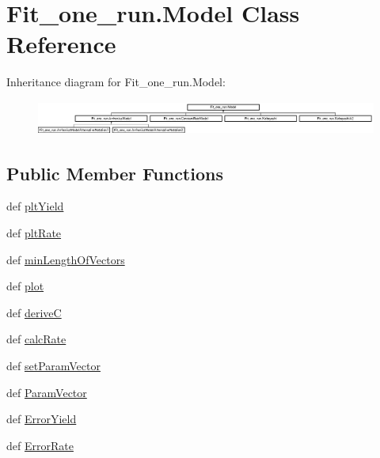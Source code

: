 \hypertarget{classFit__one__run_1_1Model}{\section{\-Fit\-\_\-one\-\_\-run.\-Model \-Class \-Reference}
\label{classFit__one__run_1_1Model}
}
\-Inheritance diagram for \-Fit\-\_\-one\-\_\-run.\-Model\-:\begin{figure}[H]
\begin{center}
\leavevmode
\includegraphics[height=1.131313cm]{classFit__one__run_1_1Model}
\end{center}
\end{figure}
\subsection*{\-Public \-Member \-Functions}
\begin{DoxyCompactItemize}
\item 
def \hyperlink{classFit__one__run_1_1Model_aa304b32155938a713c33f0dc03a135f3}{plt\-Yield}
\item 
def \hyperlink{classFit__one__run_1_1Model_a9c28d95902adf00f5aaa642f0919fc61}{plt\-Rate}
\item 
def \hyperlink{classFit__one__run_1_1Model_a26fc879ca33c9171ebb4a97bc4b0c46b}{min\-Length\-Of\-Vectors}
\item 
def \hyperlink{classFit__one__run_1_1Model_a98159c954f1f1be2a34be3ea53d11493}{plot}
\item 
def \hyperlink{classFit__one__run_1_1Model_ace9df4177c5ae753dbe190e2f8268149}{derive\-C}
\item 
def \hyperlink{classFit__one__run_1_1Model_a07ae4534de2a6ef241d71facdffb227e}{calc\-Rate}
\item 
def \hyperlink{classFit__one__run_1_1Model_a174aec9b05dbe01ec103f7ba75d6516c}{set\-Param\-Vector}
\item 
def \hyperlink{classFit__one__run_1_1Model_a3c9239f0ac062fdae0bda395636c0372}{\-Param\-Vector}
\item 
def \hyperlink{classFit__one__run_1_1Model_aa2bc4ba19704350fb2ff441734b51b10}{\-Error\-Yield}
\item 
def \hyperlink{classFit__one__run_1_1Model_aad63c345c343f0c7d1cf20135dc0a0e5}{\-Error\-Rate}
\end{DoxyCompactItemize}


